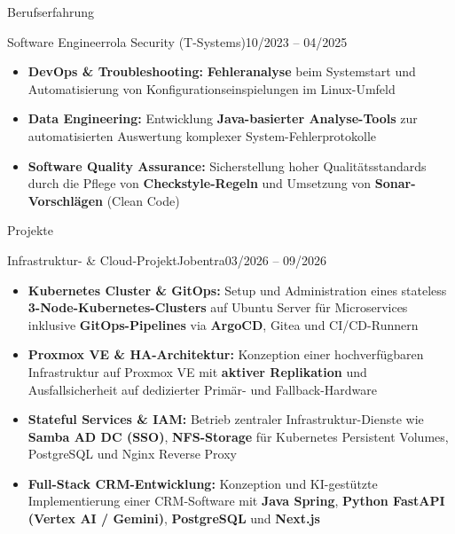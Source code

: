 \documentclass[]{mcdowellcv}
\begin{document}
\begin{cvsection}{Berufserfahrung}
        \begin{cvsubsection}{Software Engineer}{rola Security (T-Systems)}{10/2023 -- 04/2025}
            \begin{itemize}
                \item \textbf{DevOps \& Troubleshooting:} \textbf{Fehleranalyse} beim Systemstart und Automatisierung von Konfigurationseinspielungen im Linux-Umfeld
                \item \textbf{Data Engineering:} Entwicklung \textbf{Java-basierter Analyse-Tools} zur automatisierten Auswertung komplexer System-Fehlerprotokolle
                \item \textbf{Software Quality Assurance:} Sicherstellung hoher Qualitätsstandards durch die Pflege von \textbf{Checkstyle-Regeln} und Umsetzung von \textbf{Sonar-Vorschlägen} (Clean Code)
            \end{itemize}
        \end{cvsubsection}
    \end{cvsection}

    \vspace{0.2cm}

    \begin{cvsection}{Projekte}
        \begin{cvsubsection}{Infrastruktur- \& Cloud-Projekt}{Jobentra}{03/2026 -- 09/2026}
            \begin{itemize}
                \item \textbf{Kubernetes Cluster \& GitOps:} Setup und Administration eines stateless \textbf{3-Node-Kubernetes-Clusters} auf Ubuntu Server für Microservices inklusive \textbf{GitOps-Pipelines} via \textbf{ArgoCD}, Gitea und CI/CD-Runnern
                \item \textbf{Proxmox VE \& HA-Architektur:} Konzeption einer hochverfügbaren Infrastruktur auf Proxmox VE mit \textbf{aktiver Replikation} und Ausfallsicherheit auf dedizierter Primär- und Fallback-Hardware
                \item \textbf{Stateful Services \& IAM:} Betrieb zentraler Infrastruktur-Dienste wie \textbf{Samba AD DC (SSO)}, \textbf{NFS-Storage} für Kubernetes Persistent Volumes, PostgreSQL und Nginx Reverse Proxy
                \item \textbf{Full-Stack CRM-Entwicklung:} Konzeption und KI-gestützte Implementierung einer CRM-Software mit \textbf{Java Spring}, \textbf{Python FastAPI (Vertex AI / Gemini)}, \textbf{PostgreSQL} und \textbf{Next.js}
            \end{itemize}
        \end{cvsubsection}
    \end{cvsection}
\end{document}
